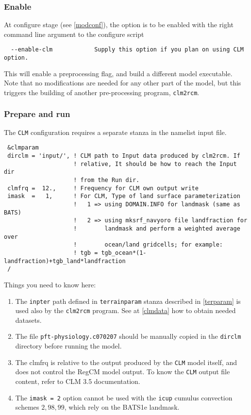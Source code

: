 \subsubsection{Enable}

At configure stage (see \ref{modconf}), the option is to be enabled with the
right command line argument to the configure script

\begin{Verbatim}
  --enable-clm            Supply this option if you plan on using CLM option.
\end{Verbatim}

This will enable a preprocessing flag, and build a different model executable.
Note that no modifications are needed for any other part of the model, but
this triggers the building of another pre-processing program, \verb=clm2rcm=.

\subsubsection{Prepare and run}
\label{clmrun}

The \verb=CLM= configuration requires a separate stanza in the namelist input
file.

{\footnotesize
\begin{Verbatim}
 &clmparam
 dirclm = 'input/', ! CLM path to Input data produced by clm2rcm. If 
                    ! relative, It should be how to reach the Input dir
                    ! from the Run dir.
 clmfrq =  12.,     ! Frequency for CLM own output write
 imask  =   1,      ! For CLM, Type of land surface parameterization
                    !   1 => using DOMAIN.INFO for landmask (same as BATS)
                    !   2 => using mksrf_navyoro file landfraction for
                    !        landmask and perform a weighted average over
                    !        ocean/land gridcells; for example:
                    ! tgb = tgb_ocean*(1-landfraction)+tgb_land*landfraction
 /
\end{Verbatim}
}

Things you need to know here:

\begin{enumerate}
\item The \verb=inpter= path defined in \verb=terrainparam= stanza described in
\ref{terparam} is used also by the \verb=clm2rcm= program. See at \ref{clmdata}
how to obtain needed datasets.
\item The file \verb=pft-physiology.c070207= should be manually copied in the
\verb=dirclm= directory before running the model.
\item The clmfrq is relative to the output produced by the \verb=CLM= model
itself, and does not control the RegCM model output. To know the \verb=CLM=
output file content, refer to CLM 3.5 documentation.
\item The \verb'imask = 2' option cannot be used with the \verb'icup'
cumulus convection schemes $2, 98, 99$, which rely on the BATS1e landmask.
\end{enumerate}


